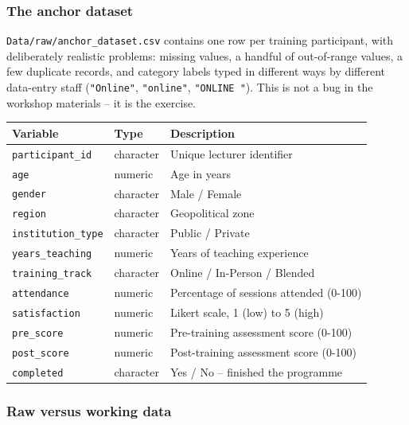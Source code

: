 \documentclass[11pt]{article}
\begin{document}
\hypertarget{the-anchor-dataset}{%
\subsubsection{The anchor dataset}\label{the-anchor-dataset}}

\texttt{Data/raw/anchor\_dataset.csv} contains one row per training
participant, with deliberately realistic problems: missing values, a
handful of out-of-range values, a few duplicate records, and category
labels typed in different ways by different data-entry staff
(\texttt{"Online"}, \texttt{"online"}, \texttt{"ONLINE\ "}). This is not
a bug in the workshop materials -- it is the exercise.

\begin{longtable}[]{@{}lll@{}}
\toprule\noalign{}
Variable & Type & Description \\
\midrule\noalign{}
\endhead
\bottomrule\noalign{}
\endlastfoot
\texttt{participant\_id} & character & Unique lecturer identifier \\
\texttt{age} & numeric & Age in years \\
\texttt{gender} & character & Male / Female \\
\texttt{region} & character & Geopolitical zone \\
\texttt{institution\_type} & character & Public / Private \\
\texttt{years\_teaching} & numeric & Years of teaching experience \\
\texttt{training\_track} & character & Online / In-Person / Blended \\
\texttt{attendance} & numeric & Percentage of sessions attended
(0-100) \\
\texttt{satisfaction} & numeric & Likert scale, 1 (low) to 5 (high) \\
\texttt{pre\_score} & numeric & Pre-training assessment score (0-100) \\
\texttt{post\_score} & numeric & Post-training assessment score
(0-100) \\
\texttt{completed} & character & Yes / No -- finished the programme \\
\end{longtable}

\hypertarget{raw-versus-working-data}{%
\subsubsection{Raw versus working data}\label{raw-versus-working-data}}
\end{document}
